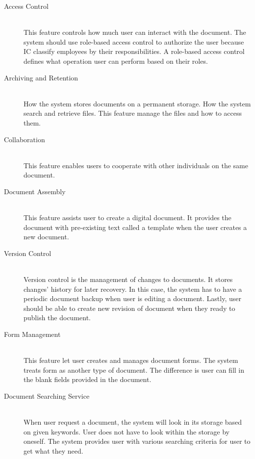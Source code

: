 \begin{description}
\item[Access Control] \hfill \\
This feature controls how much user can interact with the document.
The system should use role-based access control to authorize the user because IC classify employees by their responsibilities.
A role-based access control defines what operation user can perform based on their roles.

\item[Archiving and Retention] \hfill \\
How the system stores documents on a permanent storage.
How the system search and retrieve files.
This feature manage the files and how to access them.

\item[Collaboration] \hfill \\
This feature enables users to cooperate with other individuals on the same document. 

\item[Document Assembly] \hfill \\
This feature assists user to create a digital document.
It provides the document with pre-existing text called a template when the user creates a new document.

\item[Version Control] \hfill \\
Version control is the management of changes to documents.
It stores changes' history for later recovery.
In this case, the system has to have a periodic document backup when user is editing a document.
Lastly, user should be able to create new revision of document when they ready to publish the document.

\item[Form Management] \hfill \\
This feature let user creates and manages document forms.
The system treats form as another type of document.
The difference is user can fill in the blank fields provided in the document.

\item[Document Searching Service] \hfill \\
When user request a document, the system will look in its storage based on given keywords.
User does not have to look within the storage by oneself.
The system provides user with various searching criteria for user to get what they need.
\end{description}

